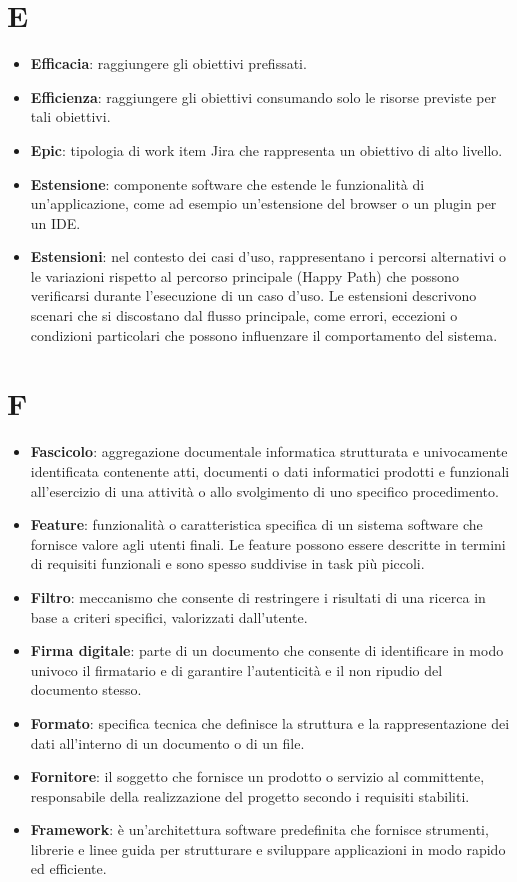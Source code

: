 \documentclass[a4paper,12pt]{article}
\begin{document}
\section{E}
\begin{itemize}
    \item \textbf{Efficacia}: raggiungere gli obiettivi prefissati.
    \item \textbf{Efficienza}: raggiungere gli obiettivi consumando solo le risorse previste per tali obiettivi.
    \item \textbf{Epic}: tipologia di work item Jira che rappresenta un obiettivo di alto livello.
    \item \textbf{Estensione}: componente software che estende le funzionalità di un'applicazione, come ad esempio un'estensione del browser o un plugin per un IDE.
    \item \textbf{Estensioni}: nel contesto dei casi d'uso, rappresentano i percorsi alternativi o le variazioni rispetto al percorso principale (Happy Path) che possono verificarsi durante l'esecuzione di un caso d'uso. Le estensioni descrivono scenari che si discostano dal flusso principale, come errori, eccezioni o condizioni particolari che possono influenzare il comportamento del sistema.
\end{itemize}
\section{F}
\begin{itemize}
    \item \textbf{Fascicolo}: aggregazione documentale informatica strutturata e univocamente identificata contenente atti, documenti o dati informatici prodotti e funzionali all'esercizio di una attività o allo svolgimento di uno specifico procedimento.
    \item \textbf{Feature}: funzionalità o caratteristica specifica di un sistema software che fornisce valore agli utenti finali. Le feature possono essere descritte in termini di requisiti funzionali e sono spesso suddivise in task più piccoli.
    \item \textbf{Filtro}: meccanismo che consente di restringere i risultati di una ricerca in base a criteri specifici, valorizzati dall'utente.
    \item \textbf{Firma digitale}: parte di un documento che consente di identificare in modo univoco il firmatario e di garantire l'autenticità e il non ripudio del documento stesso.
    \item \textbf{Formato}: specifica tecnica che definisce la struttura e la rappresentazione dei dati all'interno di un documento o di un file.
    \item \textbf{Fornitore}: il soggetto che fornisce un prodotto o servizio al committente, responsabile della realizzazione del progetto secondo i requisiti stabiliti.
    \item \textbf{Framework}: è un'architettura software predefinita che fornisce strumenti, librerie e linee guida per strutturare e sviluppare applicazioni in modo rapido ed efficiente.
\end{itemize}
\end{document}
